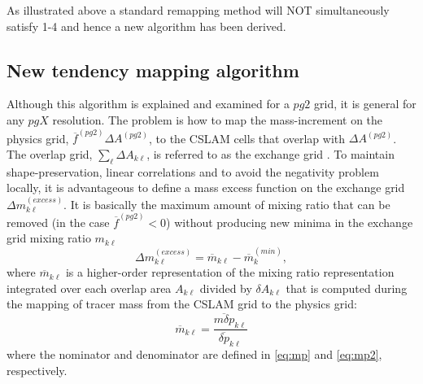 





As illustrated above a standard remapping method will NOT simultaneously satisfy 1-4 and hence a new algorithm has been derived.
\subsection{New tendency mapping algorithm}
Although this algorithm is explained and examined for a $pg2$ grid, it is general for any $pgX$ resolution. The problem is how to map the mass-increment on the physics grid, ${\overline{f}}^{(pg2)}\Delta A^{(pg2)}$, to the CSLAM cells that overlap with $\Delta A^{(pg2)}$. The overlap grid, $\sum_\ell \Delta A_{k\ell}$, is referred to as the exchange grid {\color{red}{edit - you equated overlap grid and exchange grid earlier}}. To maintain shape-preservation, linear correlations and to avoid the negativity problem locally, it is advantageous to define a mass excess function on the exchange grid $\Delta m_{k\ell}^{(excess)}$. It is basically the maximum amount of mixing ratio that can be removed (in the case ${\overline{f}}^{(pg2)}<0$) without producing new minima in the exchange grid mixing ratio $m_{k\ell}$
\begin{equation}
\Delta m^{(excess)}_{k\ell}=\overline{m}_{k\ell}-\overline{m}_k^{(min)},
\end{equation}
where $\overline{m}_{k\ell}$ is a higher-order representation of the mixing ratio representation integrated over each overlap area $A_{k\ell}$ divided by $\delta A_{k\ell}$ that is computed during the mapping of tracer mass from the CSLAM grid to the physics grid:
\begin{equation}
\label{eq:moverlap}
\overline{m}_{k\ell}=\frac{\overline{m\delta p}_{k\ell}}{\overline{\delta p}_{k\ell}}
\end{equation}
where the nominator and denominator are defined in \eqref{eq:mp} and \eqref{eq:mp2}, respectively. 

